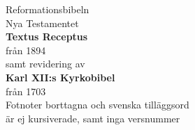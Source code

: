 \begin{center}

    {\fontsize{45}{50}\selectfont Reformationsbibeln}\\[1em]

    {\fontsize{20}{24}\selectfont 
    {Nya Testamentet} }\\[1em]

    {\fontsize{20}{24}\selectfont \textbf{Textus Receptus}}\\[0.5em]
    {\fontsize{12}{15}\selectfont från 1894}\\[0.5em]

    {\fontsize{12}{15}\selectfont samt revidering av}\\[1em]

    {\fontsize{20}{24}\selectfont \textbf{Karl XII:s Kyrkobibel}}\\[0.5em]
    {\fontsize{12}{15}\selectfont från 1703}\\[4em]

    {\fontsize{11}{13} \selectfont *Fotnoter borttagna och svenska tilläggsord\\ är ej kursiverade, samt inga versnummer}

\end{center}